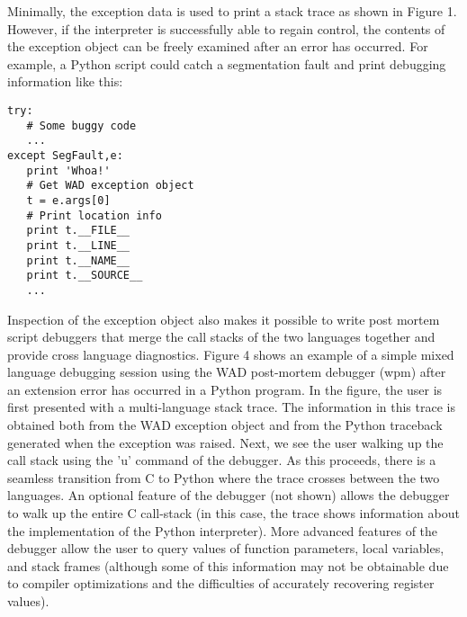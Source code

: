 Minimally, the exception data is used to print a stack trace as shown
in Figure 1.  However, if the interpreter is successfully able to
regain control, the contents of the exception object can be
freely examined after an error has occurred.  For example, a Python
script could catch a segmentation fault and print debugging information
like this:

\begin{verbatim}
try:
   # Some buggy code
   ...
except SegFault,e:
   print 'Whoa!'
   # Get WAD exception object
   t = e.args[0]
   # Print location info
   print t.__FILE__
   print t.__LINE__
   print t.__NAME__
   print t.__SOURCE__
   ...
\end{verbatim}

Inspection of the exception object also makes it possible to write post mortem
script debuggers that merge the call stacks of the two languages together and
provide cross language diagnostics.  Figure 4 shows an
example of a simple mixed language debugging session using the WAD
post-mortem debugger (wpm) after an extension error has occurred in a
Python program.  In the figure, the user is first presented with a
multi-language stack trace.  The information in this trace is obtained
both from the WAD exception object and from the Python traceback
generated when the exception was raised. Next, we see the user walking
up the call stack using the 'u' command of the debugger.  As this
proceeds, there is a seamless transition from C to Python where the
trace crosses between the two languages.  An optional feature of the
debugger (not shown) allows the debugger to walk up the entire C
call-stack (in this case, the trace shows information about the
implementation of the Python interpreter).  More advanced features of
the debugger allow the user to query values of function
parameters, local variables, and stack frames (although some of this
information may not be obtainable due to compiler optimizations and the
difficulties of accurately recovering register values).


